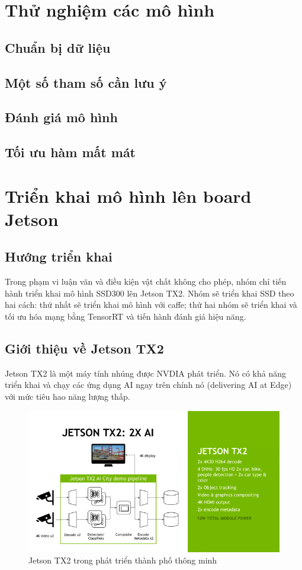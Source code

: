 \documentclass[a4paper]{report}
\begin{document}
\section{Thử nghiệm các mô hình}
\subsection{Chuẩn bị dữ liệu}
\subsection{Một số tham số cần lưu ý}
\subsection{Đánh giá mô hình}
\subsection{Tối ưu hàm mất mát}

\section{Triển khai mô hình lên board Jetson}
\subsection{Hướng triển khai}
Trong phạm vi luận văn và điều kiện vật chất không cho phép, nhóm chỉ tiến hành triển khai mô hình SSD300 lên Jetson TX2. Nhóm sẽ triển khai SSD theo hai cách: thứ nhất sẽ triển khai mô hình với caffe; thứ hai nhóm sẽ triển khai và tối ưu hóa mạng bằng TensorRT và tiến hành đánh giá hiệu năng.
\subsection{Giới thiệu về Jetson TX2}
Jetson TX2 là một máy tính nhúng được NVDIA phát triển. Nó có khả năng triển khai và chạy các ứng dụng AI ngay trên chính nó (delivering AI at Edge) với mức tiêu hao năng lượng thấp. 
\\

\begin{figure}[h!]
	\centering
	\includegraphics[width=1\textwidth]{4_2_tx2.png}
	\caption{Jetson TX2 trong phát triển thành phố thông minh}
\end{figure}
\end{document}
